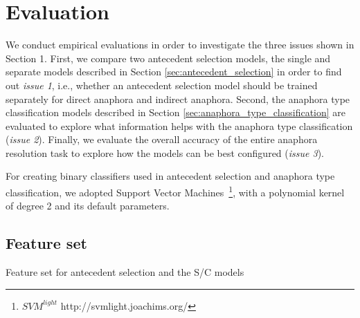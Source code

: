 \documentclass[english]{jnlp_1.4}
\newcommand{\wire}[1]{}
\begin{document}
\section{Evaluation} \label{sec:evaluation}

We conduct empirical evaluations in order to investigate the three
issues shown in Section 1. First, we compare two antecedent selection
models, the single and separate models described in Section
\ref{sec:antecedent_selection} in order to find out \emph{issue 1},
i.e., whether an antecedent selection model should be trained
separately for direct anaphora and indirect anaphora. Second, the
anaphora type classification models described in Section
\ref{sec:anaphora_type_classification} are evaluated to explore what
information helps with the anaphora type classification (\emph{issue
  2}). Finally, we evaluate the overall accuracy of the entire
anaphora resolution task to explore how the models can be best
configured (\emph{issue 3}).

\wire{ In our experiments, we used anaphors whose antecedent is a head
  of NP that appears in the preceding context of the anaphor (i.e.,
  cataphora is ignored), only taking articles in the broadcast domain
  into account. Therefore, we used 572 instances of direct anaphora,
  878 instances of indirect anaphora and 248 instances of
  exophora. The evaluation was carried out by 10-fold
  cross-validation. In our evaluation of antecedent selection, if a
  selected antecedent is in the same direct-anaphoric chain as the
  labeled antecedent, this selected antecedent is evaluated as
  correct\footnote{\wire{We manually checked our results because of the lack
    of annotation of anaphoric chains as noted in Section
    \ref{sec:dataset}. Due to the cost of this manual
      checking, we took only the broadcast articles into account in
      our experiments, leaving the editorials out.} }. }


For creating binary classifiers used in antecedent selection and
anaphora type classification, we adopted Support Vector
Machines~\footnote{$SVM^{light}$
  http://svmlight.joachims.org/}, with a polynomial kernel of degree 2
and its default parameters.


\subsection{Feature set} \label{sec:feature_set}

\begin{table}[b]
\caption{Feature set for antecedent selection and the S/C models}
 \label{tb:features_antident}

\end{table}
\end{document}
